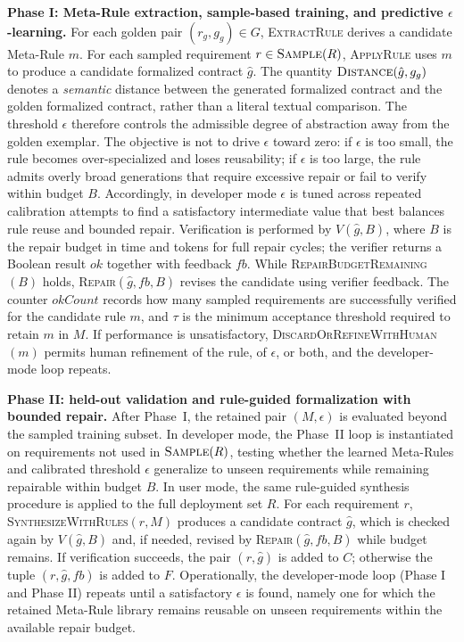 \documentclass[conference]{IEEEtran}
\begin{document}
\textbf{Phase I: Meta-Rule extraction, sample-based training, and predictive $\epsilon$-learning.}
For each golden pair $(r_g,g_g)\in G$, \textsc{ExtractRule} derives a candidate Meta-Rule $m$. For each sampled requirement $r\in \textsc{Sample}(R)$, \textsc{ApplyRule} uses $m$ to produce a candidate formalized contract $\hat{g}$. The quantity $\textsc{Distance}(\hat{g},g_g)$ denotes a \emph{semantic} distance between the generated formalized contract and the golden formalized contract, rather than a literal textual comparison. The threshold $\epsilon$ therefore controls the admissible degree of abstraction away from the golden exemplar. The objective is not to drive $\epsilon$ toward zero: if $\epsilon$ is too small, the rule becomes over-specialized and loses reusability; if $\epsilon$ is too large, the rule admits overly broad generations that require excessive repair or fail to verify within budget $B$. Accordingly, in developer mode $\epsilon$ is tuned across repeated calibration attempts to find a satisfactory intermediate value that best balances rule reuse and bounded repair. Verification is performed by $V(\hat{g},B)$, where $B$ is the repair budget in time and tokens for full repair cycles; the verifier returns a Boolean result $ok$ together with feedback $fb$. While \textsc{RepairBudgetRemaining}$(B)$ holds, \textsc{Repair}$(\hat{g},fb,B)$ revises the candidate using verifier feedback. The counter $okCount$ records how many sampled requirements are successfully verified for the candidate rule $m$, and $\tau$ is the minimum acceptance threshold required to retain $m$ in $M$. If performance is unsatisfactory, \textsc{DiscardOrRefineWithHuman}$(m)$ permits human refinement of the rule, of $\epsilon$, or both, and the developer-mode loop repeats.

\textbf{Phase II: held-out validation and rule-guided formalization with bounded repair.}
After Phase~I, the retained pair $(M,\epsilon)$ is evaluated beyond the sampled training subset. In developer mode, the Phase~II loop is instantiated on requirements not used in $\textsc{Sample}(R)$, testing whether the learned Meta-Rules and calibrated threshold $\epsilon$ generalize to unseen requirements while remaining repairable within budget $B$. In user mode, the same rule-guided synthesis procedure is applied to the full deployment set $R$. For each requirement $r$, \textsc{SynthesizeWithRules}$(r,M)$ produces a candidate contract $\hat{g}$, which is checked again by $V(\hat{g},B)$ and, if needed, revised by \textsc{Repair}$(\hat{g},fb,B)$ while budget remains. If verification succeeds, the pair $(r,\hat{g})$ is added to $C$; otherwise the tuple $(r,\hat{g},fb)$ is added to $F$. Operationally, the developer-mode loop (Phase I and Phase II) repeats until a satisfactory $\epsilon$ is found, namely one for which the retained Meta-Rule library remains reusable on unseen requirements within the available repair budget.
\end{document}
